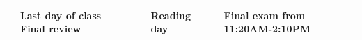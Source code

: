 \documentclass[11pt]{article}
\begin{document}
\begin{table}[ht!]
{\begin{tabular}{ | l | l | l | l | l | l |}
 & \begin{minipage}{0.18\textwidth}
Last day of class -- Final review
\end{minipage}
& \begin{minipage}{.18\textwidth}
\end{minipage}
& \begin{minipage}{.18\textwidth}
Reading day
\end{minipage}
& \begin{minipage}{.18\textwidth}
\end{minipage}
& \begin{minipage}{.18\textwidth}
Final exam from 11:20AM-2:10PM
\end{minipage}\\
\hline

\end{tabular}

}
\end{table}
\end{document}
